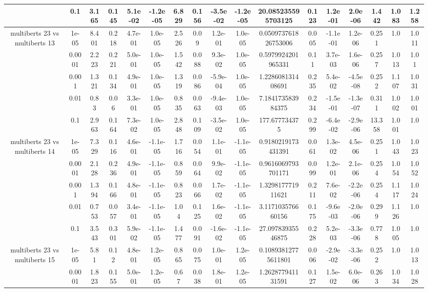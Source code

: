 \begin{tabular}{|c|c|c|c|c|c|c|c|c|c|c|c|c|c|c|c|c|}
 & 0.1 & 3.165 & 0.145 & 5.1e-02 & -1.2e-05 & 6.829 & 0.156 & -3.5e-02 & -1.2e-05 & 20.085235595703125 & 0.123 & 1.2e-01 & 2.0e-06 & 1.442 & 1.083 & 1.258 \\
\hline
\multirow{5}{*}{multiberts 23 vs multiberts 13} & 1e-05 & 8.401 & 0.218 & 4.7e-01 & 1.0e-05 & 2.526 & 0.09 & 1.2e-01 & 1.0e-05 & 0.050973761826753006 & 0.005 & -1.1e-01 & 1.2e-06 & 0.251 & 1.0 & 1.011 \\
 & 0.0001 & 2.223 & 0.221 & 5.0e-01 & 1.0e-05 & 1.542 & 0.088 & 9.3e-02 & 1.0e-05 & 0.5979924201965331 & 0.11 & 3.7e-03 & 1.6e-06 & 0.257 & 1.013 & 1.01 \\
 & 0.001 & 1.321 & 0.134 & 4.9e-01 & 1.0e-05 & 1.319 & 0.086 & -5.9e-04 & 1.0e-05 & 1.228608131408691 & 0.235 & 5.4e-02 & -4.5e-08 & 0.252 & 1.107 & 1.031 \\
 & 0.01 & 0.83 & 0.06 & 3.3e-01 & 1.0e-05 & 0.835 & 0.063 & -9.4e-03 & 1.0e-05 & 7.184173583984375 & 0.234 & -1.5e-01 & -1.3e-07 & 0.311 & 1.002 & 1.001 \\
 & 0.1 & 2.963 & 0.164 & 7.3e-02 & 1.0e-05 & 2.848 & 0.109 & -3.5e-02 & 1.0e-05 & 177.677734375 & 0.299 & -6.4e-02 & -2.9e-06 & 13.358 & 1.001 & 1.0 \\
\hline
\multirow{5}{*}{multiberts 23 vs multiberts 14} & 1e-05 & 7.329 & 0.116 & 4.6e-01 & -1.1e-05 & 1.716 & 0.054 & 1.1e-01 & -1.1e-05 & 0.9180219173431391 & 0.061 & 1.3e-02 & 4.5e-06 & 0.251 & 1.043 & 1.023 \\
 & 0.0001 & 2.128 & 0.236 & 4.9e-01 & -1.1e-05 & 0.859 & 0.064 & 9.9e-02 & -1.1e-05 & 0.9616069793701171 & 0.099 & 1.2e-01 & 2.1e-06 & 0.254 & 1.054 & 1.052 \\
 & 0.001 & 1.394 & 0.166 & 4.8e-01 & -1.1e-05 & 0.823 & 0.066 & 1.7e-02 & -1.1e-05 & 1.329817771911621 & 0.211 & 7.6e-02 & -2.2e-06 & 0.254 & 1.117 & 1.024 \\
 & 0.01 & 0.753 & 0.057 & 3.4e-01 & -1.1e-05 & 1.04 & 0.125 & 1.6e-02 & -1.1e-05 & 3.117103576660156 & 0.175 & -9.6e-03 & -2.0e-06 & 0.299 & 1.126 & 1.0 \\
 & 0.1 & 3.543 & 0.301 & 5.9e-02 & -1.1e-05 & 1.477 & 0.091 & -1.6e-02 & -1.1e-05 & 27.09783935546875 & 0.228 & 5.2e-03 & -3.3e-06 & 0.778 & 1.005 & 1.0 \\
\hline
\multirow{5}{*}{multiberts 23 vs multiberts 15} & 1e-05 & 5.81 & 0.12 & 4.8e-01 & 1.2e-05 & 0.865 & 0.075 & 1.0e-01 & 1.2e-05 & 0.10893812775611801 & 0.006 & -2.9e-02 & -3.3e-06 & 0.252 & 1.0 & 1.013 \\
 & 0.0001 & 1.823 & 0.155 & 5.0e-01 & 1.2e-05 & 0.67 & 0.038 & 1.8e-01 & 1.2e-05 & 1.262877941131591 & 0.127 & 1.5e-02 & 6.0e-06 & 0.263 & 1.034 & 1.028 \\

\end{tabular}
